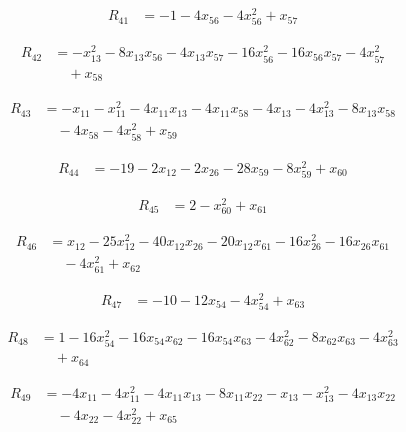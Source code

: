 \begin{align*}
R_{41} &= -1 -4 x_{56} -4 x_{56}^{2} +x_{57}
\end{align*}

\begin{align*}
R_{42} &= -x_{13}^{2} -8 x_{13} x_{56} -4 x_{13} x_{57} -16 x_{56}^{2} -16 x_{56} x_{57} -4 x_{57}^{2} \\
&\quad +x_{58}
\end{align*}

\begin{align*}
R_{43} &= -x_{11} -x_{11}^{2} -4 x_{11} x_{13} -4 x_{11} x_{58} -4 x_{13} -4 x_{13}^{2} -8 x_{13} x_{58} \\
&\quad -4 x_{58} -4 x_{58}^{2} +x_{59}
\end{align*}

\begin{align*}
R_{44} &= -19 -2 x_{12} -2 x_{26} -28 x_{59} -8 x_{59}^{2} +x_{60}
\end{align*}

\begin{align*}
R_{45} &= 2 -x_{60}^{2} +x_{61}
\end{align*}

\begin{align*}
R_{46} &= x_{12} -25 x_{12}^{2} -40 x_{12} x_{26} -20 x_{12} x_{61} -16 x_{26}^{2} -16 x_{26} x_{61} \\
&\quad -4 x_{61}^{2} +x_{62}
\end{align*}

\begin{align*}
R_{47} &= -10 -12 x_{54} -4 x_{54}^{2} +x_{63}
\end{align*}

\begin{align*}
R_{48} &= 1 -16 x_{54}^{2} -16 x_{54} x_{62} -16 x_{54} x_{63} -4 x_{62}^{2} -8 x_{62} x_{63} -4 x_{63}^{2} \\
&\quad +x_{64}
\end{align*}

\begin{align*}
R_{49} &= -4 x_{11} -4 x_{11}^{2} -4 x_{11} x_{13} -8 x_{11} x_{22} -x_{13} -x_{13}^{2} -4 x_{13} x_{22} \\
&\quad -4 x_{22} -4 x_{22}^{2} +x_{65}
\end{align*}

